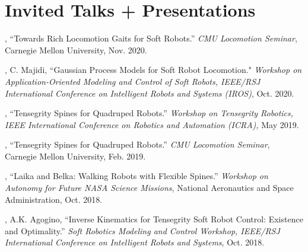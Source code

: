 \documentclass[letterpaper]{deedy-resume} %
\begin{document}
{\begin{etaremune}[itemsep=0.1cm]
\end{etaremune}


 \section{Invited Talks + Presentations}

 \vspace{0.1cm}


 \begin{etaremune}[itemsep=0.1cm]

\item \underline{{}}, ``Towards Rich Locomotion Gaits for Soft Robots.'' {\it CMU Locomotion Seminar}, Carnegie Mellon University, Nov. 2020.

\item \underline{{}}, C. Majidi, ``Gaussian Process Models for Soft Robot Locomotion." {\it Workshop on Application-Oriented Modeling and Control of Soft Robots, IEEE/RSJ International Conference on Intelligent Robots and Systems (IROS)}, Oct. 2020.

\item \underline{{}}, ``Tensegrity Spines for Quadruped Robots.'' {\it Workshop on Tensegrity Robotics, IEEE International Conference on Robotics and Automation (ICRA),} May 2019.

\item \underline{{}}, ``Tensegrity Spines for Quadruped Robots.'' {\it CMU Locomotion Seminar}, Carnegie Mellon University, Feb. 2019.

\item \underline{{}}, ``Laika and Belka: Walking Robots with Flexible Spines.'' {\it Workshop on Autonomy for Future NASA Science Missions}, National Aeronautics and Space Administration, Oct. 2018.

\item \underline{{}}, A.K. Agogino, ``Inverse Kinematics for Tensegrity Soft Robot Control: Existence and Optimality.'' {\it Soft Robotics Modeling and Control Workshop, IEEE/RSJ International Conference on Intelligent Robots and Systems}, Oct. 2018.


\end{etaremune}}
\end{document}
